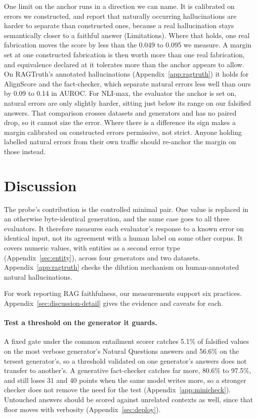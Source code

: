\documentclass[11pt]{article}
\newcommand{\movedref}{Appendix}            %
\newcommand{\movedref}{Section}
\begin{document}
One limit on the anchor runs in a direction we can name. It is calibrated on errors we constructed, and \citet{sinha-2025} report that naturally occurring hallucinations are harder to separate than constructed ones, because a real hallucination stays semantically closer to a faithful answer (Limitations). Where that holds, one real fabrication moves the score by less than the 0.049 to 0.095 we measure. A margin set at one constructed fabrication is then worth more than one real fabrication, and equivalence declared at it tolerates more than the anchor appears to allow. On RAGTruth's annotated hallucinations (Appendix~\ref{app:ragtruth}) it holds for AlignScore and the fact-checker, which separate natural errors less well than ours by 0.09 to 0.14 in AUROC. For NLI-max, the evaluator the anchor is set on, natural errors are only slightly harder, sitting just below its range on our falsified answers. That comparison crosses datasets and generators and has no paired drop, so it cannot size the error. Where there is a difference its sign makes a margin calibrated on constructed errors permissive, not strict. Anyone holding labelled natural errors from their own traffic should re-anchor the margin on those instead.



\section{Discussion}
\label{sec:discussion}

The probe's contribution is the controlled minimal pair. One value is replaced in an otherwise byte-identical generation, and the same case goes to all three evaluators. It therefore measures each evaluator's response to a known error on identical input, not its agreement with a human label on some other corpus. It covers numeric values, with entities as a second error type (\movedref~\ref{sec:entity}), across four generators and two datasets. Appendix~\ref{app:ragtruth} checks the dilution mechanism on human-annotated natural hallucinations.

For work reporting RAG faithfulness, our measurements support six practices. Appendix~\ref{sec:discussion-detail} gives the evidence and caveats for each.

\paragraph{Test a threshold on the generator it guards.} A fixed gate under the common entailment scorer catches 5.1\% of falsified values on the most verbose generator's Natural Questions answers and 56.6\% on the tersest generator's, so a threshold validated on one generator's answers does not transfer to another's. A generative fact-checker catches far more, 80.6\% to 97.5\%, and still loses 31 and 40 points when the same model writes more, so a stronger checker does not remove the need for the test (Appendix~\ref{app:minicheck}). Untouched answers should be scored against unrelated contexts as well, since that floor moves with verbosity (Appendix~\ref{sec:deploy}).
\end{document}
